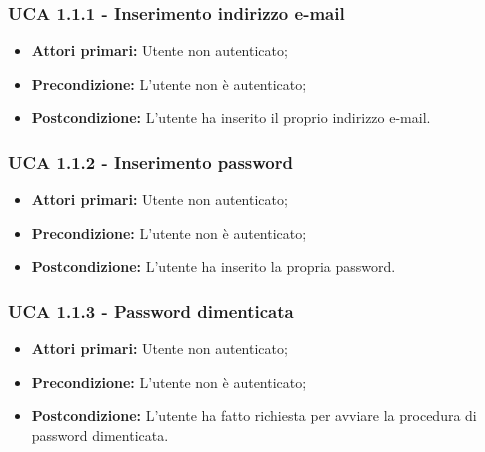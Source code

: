 \subsubsection{UCA 1.1.1 - Inserimento indirizzo e-mail}%
\begin{itemize}
\item \textbf{Attori primari:}  Utente non autenticato;
\item \textbf{Precondizione:}  L'utente non è autenticato;
\item \textbf{Postcondizione:}  L'utente ha inserito il proprio indirizzo e-mail.
\end{itemize}

\subsubsection{UCA 1.1.2 - Inserimento password}%
\begin{itemize}
\item \textbf{Attori primari:} Utente non autenticato;
\item \textbf{Precondizione:} L'utente non è autenticato;
\item \textbf{Postcondizione:} L'utente ha inserito la propria password.
\end{itemize}


\subsubsection{UCA 1.1.3 - Password dimenticata}%
\begin{itemize}
\item \textbf{Attori primari:} Utente non autenticato;
\item \textbf{Precondizione:}  L'utente non è autenticato;
\item \textbf{Postcondizione:} L'utente ha fatto richiesta per avviare la procedura di password dimenticata.
\end{itemize}

